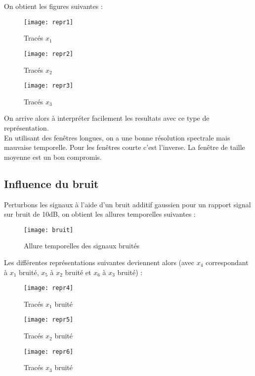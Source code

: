 \documentclass[12pt,a4paper,titlepage]{article}
\begin{document}
On obtient les figures suivantes :

\begin{figure}[H]
    \caption{Tracés $x_1$}
    \texttt{[image: repr1]}
    \centering
\end{figure}

\begin{figure}[H]
    \caption{Tracés $x_2$}
    \texttt{[image: repr2]}
    \centering
\end{figure}

\begin{figure}[H]
    \caption{Tracés $x_3$}
    \texttt{[image: repr3]}
    \centering
\end{figure}

On arrive alors à interpréter facilement les resultats avec ce type de représentation.
\\ En utilisant des fenêtres longues, on a une bonne résolution spectrale mais mauvaise temporelle. Pour les fenêtres courte c'est l'inverse.
La fenêtre de taille moyenne est un bon compromis.

\subsection{Influence du bruit}

Perturbons les signaux à l'aide d'un bruit additif gaussien pour un rapport signal sur bruit de
10dB, on obtient les allures temporelles suivantes :

\begin{figure}[H]
    \caption{Allure temporelles des signaux bruités}
    \texttt{[image: bruit]}
    \centering
\end{figure}

Les différentes représentations suivantes deviennent alors (avec $x_4$ correspondant à $x_1$ bruité,
$x_5$ à $x_2$ bruité et $x_6$ à $x_3$ bruité) :

\begin{figure}[H]
    \caption{Tracés $x_1$ bruité}
    \texttt{[image: repr4]}
    \centering
\end{figure}

\begin{figure}[H]
    \caption{Tracés $x_2$ bruité}
    \texttt{[image: repr5]}
    \centering
\end{figure}

\begin{figure}[H]
    \caption{Tracés $x_3$ bruité}
    \texttt{[image: repr6]}
    \centering
\end{figure}
\end{document}
